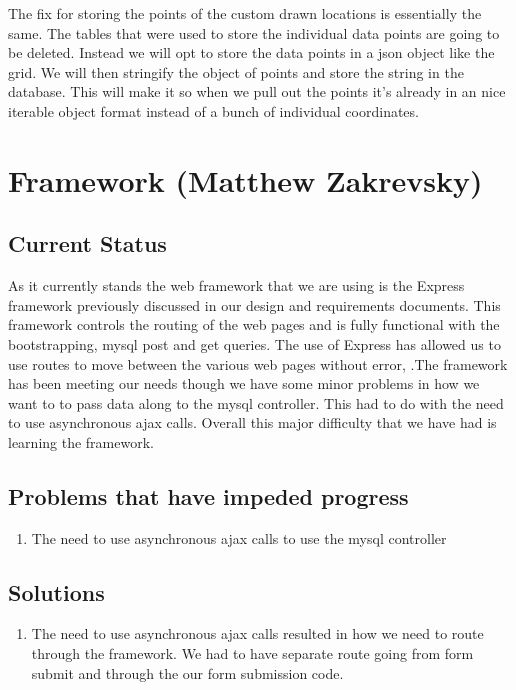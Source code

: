 \documentclass[letterpaper,10pt,titlepage, onecolumn, compsoc]{IEEEtran}
\begin{document}
The fix for storing the points of the custom drawn locations is essentially the same. The tables that were used to store the individual data points are going to be deleted. Instead we will opt to store the data points in a json object like the grid. We will then stringify the object of points and store the string in the database. This will make it so when we pull out the points it's already in an nice iterable object format instead of a bunch of individual coordinates. 

\section{Framework (Matthew Zakrevsky)}
\subsection{Current Status}
As it currently stands the web framework that we are using is the Express framework previously discussed in our design  and requirements documents. This framework controls the routing of the web pages and is fully functional with the bootstrapping, mysql post and get  queries. The use of Express has allowed us to use routes to move between the various web pages without error, .The  framework has been meeting our needs though we have some minor problems in how we want to to pass data along to the mysql controller. This had to do with the need to use asynchronous ajax calls. Overall  this  major difficulty that we have had is learning the framework. 
\subsection{Problems that have impeded progress}
\begin{enumerate}
	\item The need to use asynchronous ajax calls to use the mysql controller
\end{enumerate}

\subsection{Solutions}
\begin{enumerate}
	\item The need to use asynchronous ajax calls  resulted in how we need to route through the framework. We had to have separate route going from form submit and through the our form submission code. 
\end{enumerate}
\end{document}
